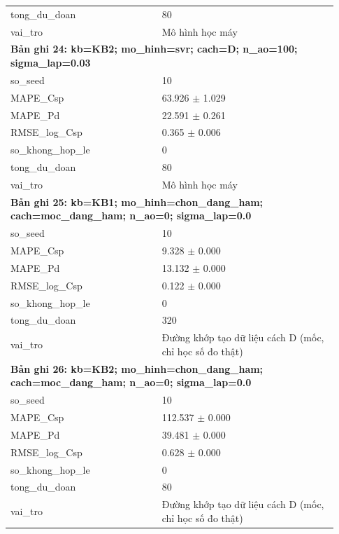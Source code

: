 \begin{longtable}{p{0.43\linewidth}p{0.50\linewidth}}
tong\_\allowbreak du\_\allowbreak doan & 80 \\
vai\_\allowbreak tro & Mô hình học máy \\
\midrule
\multicolumn{2}{p{0.95\linewidth}}{\textbf{Bản ghi 24: kb=KB2; mo\_hinh=svr; cach=D; n\_ao=100; sigma\_lap=0.03}} \\
so\_\allowbreak seed & 10 \\
MAPE\_\allowbreak Csp & 63.926 $\pm$ 1.029 \\
MAPE\_\allowbreak Pd & 22.591 $\pm$ 0.261 \\
RMSE\_\allowbreak log\_\allowbreak Csp & 0.365 $\pm$ 0.006 \\
so\_\allowbreak khong\_\allowbreak hop\_\allowbreak le & 0 \\
tong\_\allowbreak du\_\allowbreak doan & 80 \\
vai\_\allowbreak tro & Mô hình học máy \\
\midrule
\multicolumn{2}{p{0.95\linewidth}}{\textbf{Bản ghi 25: kb=KB1; mo\_hinh=chon\_dang\_ham; cach=moc\_dang\_ham; n\_ao=0; sigma\_lap=0.0}} \\
so\_\allowbreak seed & 10 \\
MAPE\_\allowbreak Csp & 9.328 $\pm$ 0.000 \\
MAPE\_\allowbreak Pd & 13.132 $\pm$ 0.000 \\
RMSE\_\allowbreak log\_\allowbreak Csp & 0.122 $\pm$ 0.000 \\
so\_\allowbreak khong\_\allowbreak hop\_\allowbreak le & 0 \\
tong\_\allowbreak du\_\allowbreak doan & 320 \\
vai\_\allowbreak tro & Đường khớp tạo dữ liệu cách D (mốc, chỉ học số đo thật) \\
\midrule
\multicolumn{2}{p{0.95\linewidth}}{\textbf{Bản ghi 26: kb=KB2; mo\_hinh=chon\_dang\_ham; cach=moc\_dang\_ham; n\_ao=0; sigma\_lap=0.0}} \\
so\_\allowbreak seed & 10 \\
MAPE\_\allowbreak Csp & 112.537 $\pm$ 0.000 \\
MAPE\_\allowbreak Pd & 39.481 $\pm$ 0.000 \\
RMSE\_\allowbreak log\_\allowbreak Csp & 0.628 $\pm$ 0.000 \\
so\_\allowbreak khong\_\allowbreak hop\_\allowbreak le & 0 \\
tong\_\allowbreak du\_\allowbreak doan & 80 \\
vai\_\allowbreak tro & Đường khớp tạo dữ liệu cách D (mốc, chỉ học số đo thật) \\
\midrule
\bottomrule
\end{longtable}
